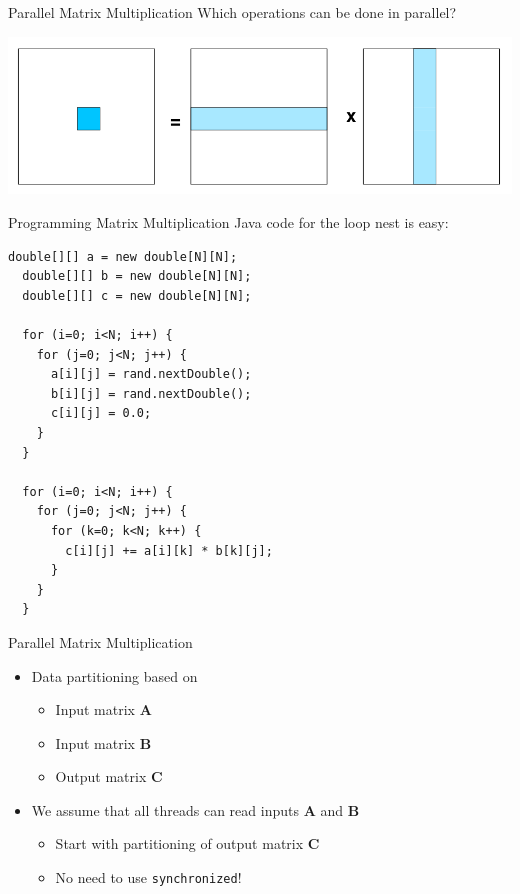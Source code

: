 \begin{frame}{Parallel Matrix Multiplication}
  Which operations can be done in parallel?


 \includegraphics[width=\textwidth]{figures/matrix-1}
\end{frame}

\begin{frame}[fragile]{Programming Matrix Multiplication}
  Java code for the loop nest is easy:

\begin{lstlisting}[basicstyle=\fontsize{7}{9}\selectfont\ttfamily]
  double[][] a = new double[N][N];
  double[][] b = new double[N][N];
  double[][] c = new double[N][N];

  for (i=0; i<N; i++) {
    for (j=0; j<N; j++) {
      a[i][j] = rand.nextDouble();
      b[i][j] = rand.nextDouble();
      c[i][j] = 0.0;
    }
  }

  for (i=0; i<N; i++) {
    for (j=0; j<N; j++) {
      for (k=0; k<N; k++) {
        c[i][j] += a[i][k] * b[k][j];
      }
    }
  }
\end{lstlisting}
\end{frame}

\begin{frame}{Parallel Matrix Multiplication}
  \begin{itemize}
  \item Data partitioning based on
    \begin{itemize}
    \item Input matrix $\mathbf{A}$
    \item Input matrix $\mathbf{B}$
    \item Output matrix $\mathbf{C}$
    \end{itemize}
  \item We assume that all threads can read inputs $\mathbf{A}$ and
    $\mathbf{B}$
    \begin{itemize}
    \item Start with partitioning of output matrix $\mathbf{C}$
    \item No need to use \lstinline!synchronized!!
    \end{itemize}
  \end{itemize}
\end{frame}

